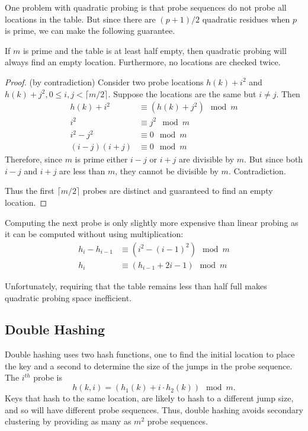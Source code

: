 One problem with quadratic probing is that probe sequences do not
probe all locations in the table. But since there are $(p+1)/2$
quadratic residues when $p$ is prime, we can make the following
guarantee.

\begin{claim} If $m$ is prime and the table is at least half empty, then
quadratic probing will always find an empty location. Furthermore, no locations
are checked twice.

\newcommand{\ceiling}[1]{\lceil #1 \rceil}
\begin{proof} (by contradiction)
Consider two probe locations $h(k) + i^2$ and $h(k) + j^2, 0 \leq i,j
< \ceiling{m/2}$. Suppose the locations are the same but $i \neq j$. Then
\begin{align*}
h(k) +i^2 &\equiv (h(k) + j^2)\mod m \\
i^2 &\equiv j^2 \mod m \\
i^2 - j^2 &\equiv 0 \mod m \\
(i-j)(i+j) &\equiv 0 \mod m
\end{align*}
Therefore, since $m$ is prime either $i-j$ or $i+j$ are divisible by
$m$. But since both $i-j$ and $i+j$ are less than $m$, they cannot be
divisible by $m$.  Contradiction.

Thus the first $\ceiling{m/2}$ probes are distinct and
guaranteed to find an empty location.
\end{proof}
\end{claim}

Computing the next probe is only slightly more expensive than linear
probing as it can be computed without using multiplication:
\begin{align*}
h_i - h_{i-1} &\equiv (i^2 - (i-1)^2)\mod m \\
h_i &\equiv (h_{i-1} + 2i - 1) \mod m
\end{align*}

Unfortunately, requiring that the table remains less than half full
makes quadratic probing space inefficient.

\subsection{Double Hashing}


Double hashing uses two hash functions, one to find the initial
location to place the key and a second to determine the size of the
jumps in the probe sequence.
The $i^{th}$ probe is \[h(k,i) = (h_1(k) + i\cdot h_2(k)) \mod
m.\]
Keys that hash to the same location, are
likely to hash to a different jump size, and so will have different
probe sequences.  Thus, double hashing avoids secondary clustering by
providing as many as $m^2$ probe sequences.

